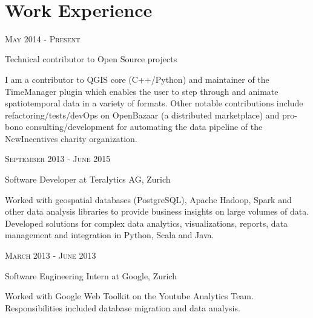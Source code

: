 \documentclass[10pt]{article} %
\begin{document}
\begin{minipage}[t]{0.5\textwidth}
\begin{tabular}{rl}
\end{tabular}\\[9pt]


\section{Work Experience} 

{\raggedleft\textsc{May 2014 - Present}\par}

{\raggedright\large Technical contributor to Open Source projects\\
}

\normalsize{ I am a contributor to QGIS core (C++/Python) and maintainer of the TimeManager plugin which enables the user to step through and animate spatiotemporal data in a variety of formats. Other notable contributions include refactoring/tests/devOps on OpenBazaar (a distributed marketplace) and pro-bono consulting/development for automating the data pipeline of the NewIncentives charity organization.}

{\raggedleft\textsc{September 2013 - June 2015}\par}

{\raggedright\large Software Developer at Teralytics AG, Zurich\\
}

\normalsize{Worked with geospatial databases (PostgreSQL), Apache Hadoop, Spark and other data analysis libraries to provide business insights on large volumes of data. Developed solutions for complex data analytics, visualizations, reports, data management and integration in Python, Scala and Java.}

{\raggedleft\textsc{March 2013 - June 2013}\par}

{\raggedright\large Software Engineering Intern at Google, Zurich\\
}

\normalsize{Worked with Google Web Toolkit on the Youtube Analytics Team. Responsibilities included database migration and data analysis.}\\



\end{minipage}
\end{document}
